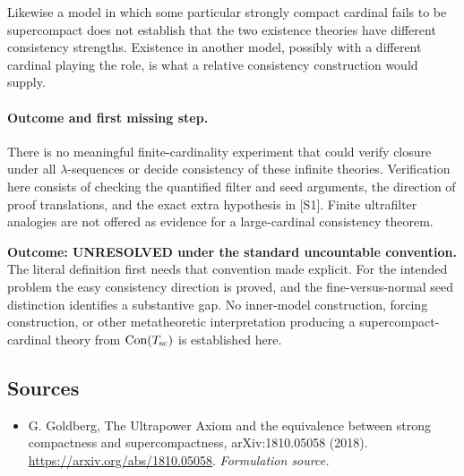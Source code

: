 \documentclass[11pt]{article}
\begin{document}
Likewise a model in which some particular strongly compact cardinal
fails to be supercompact does not establish that the two existence
theories have different consistency strengths. Existence in another
model, possibly with a different cardinal playing the role, is what a
relative consistency construction would supply.

\paragraph{Outcome and first missing step.}
There is no meaningful finite-cardinality experiment that could verify
closure under all $\lambda$-sequences or decide consistency of these
infinite theories. Verification here consists of checking the quantified
filter and seed arguments, the direction of proof translations, and
the exact extra hypothesis in [S1]. Finite ultrafilter analogies are
not offered as evidence for a large-cardinal consistency theorem.

\textbf{Outcome: UNRESOLVED under the standard uncountable convention.}
The literal definition first needs that convention made explicit.
For the intended problem the easy consistency direction is proved,
and the fine-versus-normal seed distinction identifies a substantive
gap. No inner-model construction, forcing construction, or other
metatheoretic interpretation producing a supercompact-cardinal theory
from $\operatorname{Con}(T_{\rm sc})$ is established here.

\subsection{Sources}
\begin{itemize}
\item[S1]G. Goldberg, The Ultrapower Axiom and the equivalence between strong compactness and supercompactness, arXiv:1810.05058 (2018).
\url{https://arxiv.org/abs/1810.05058}.
\textit{Formulation source.}
\end{itemize}
\end{document}
